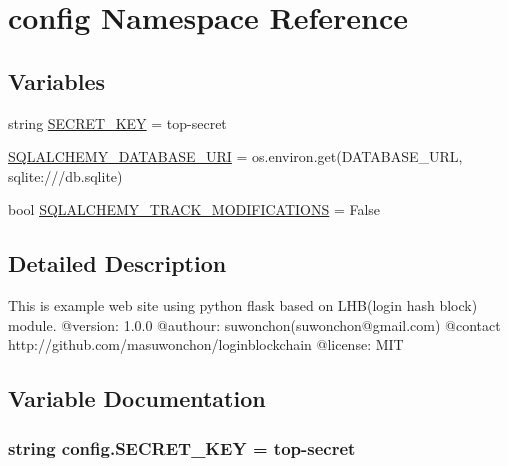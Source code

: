 \hypertarget{namespaceconfig}{}\section{config Namespace Reference}
\label{namespaceconfig}
\subsection*{Variables}
\begin{DoxyCompactItemize}
\item 
string \hyperlink{namespaceconfig_a9a12d1637d39ac73154cfb736dd2e36a}{S\+E\+C\+R\+E\+T\+\_\+\+K\+EY} = \textquotesingle{}top-\/secret\textquotesingle{}
\item 
\hyperlink{namespaceconfig_abfb380a150ba49f3296981414777eed8}{S\+Q\+L\+A\+L\+C\+H\+E\+M\+Y\+\_\+\+D\+A\+T\+A\+B\+A\+S\+E\+\_\+\+U\+RI} = os.\+environ.\+get(\textquotesingle{}D\+A\+T\+A\+B\+A\+S\+E\+\_\+\+U\+RL\textquotesingle{}, \textquotesingle{}sqlite\+:///db.\+sqlite\textquotesingle{})
\item 
bool \hyperlink{namespaceconfig_af3c11aea509436fc561e22b8a479f7b3}{S\+Q\+L\+A\+L\+C\+H\+E\+M\+Y\+\_\+\+T\+R\+A\+C\+K\+\_\+\+M\+O\+D\+I\+F\+I\+C\+A\+T\+I\+O\+NS} = False
\end{DoxyCompactItemize}


\subsection{Detailed Description}
\begin{DoxyVerb}This is example web site using python flask based on LHB(login hash block) module.
@version: 1.0.0
@authour: suwonchon(suwonchon@gmail.com)
@contact http://github.com/masuwonchon/loginblockchain
@license: MIT
\end{DoxyVerb}
 

\subsection{Variable Documentation}
\subsubsection[{\texorpdfstring{S\+E\+C\+R\+E\+T\+\_\+\+K\+EY}{SECRET_KEY}}]{\setlength{\rightskip}{0pt plus 5cm}string config.\+S\+E\+C\+R\+E\+T\+\_\+\+K\+EY = \textquotesingle{}top-\/secret\textquotesingle{}}\hypertarget{namespaceconfig_a9a12d1637d39ac73154cfb736dd2e36a}{}\label{namespaceconfig_a9a12d1637d39ac73154cfb736dd2e36a}


